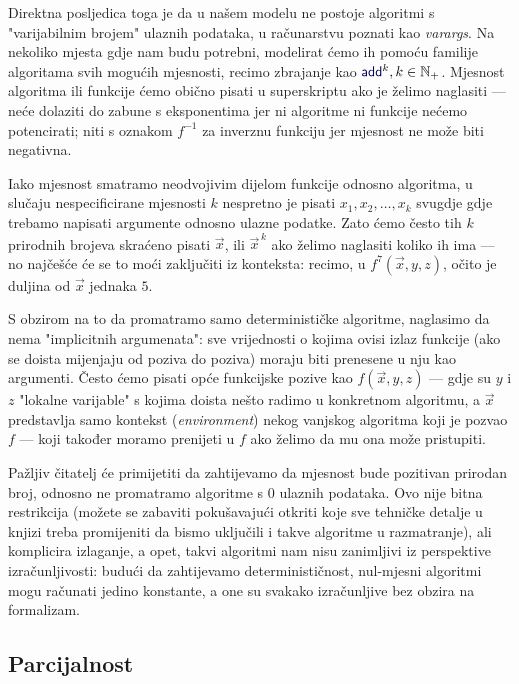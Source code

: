 Direktna posljedica toga je da u našem modelu ne postoje algoritmi s "varijabilnim brojem" ulaznih podataka, u računarstvu poznati kao \emph{varargs}. Na nekoliko mjesta gdje nam budu potrebni, modelirat ćemo ih pomoću familije algoritama svih mogućih mjesnosti, recimo zbrajanje kao $\f{add}^k,k\in\N_+$. Mjesnost algoritma ili funkcije ćemo obično pisati u superskriptu ako je želimo naglasiti --- neće dolaziti do zabune s eksponentima jer ni algoritme ni funkcije nećemo potencirati; niti s oznakom $f^{-1}$ za inverznu funkciju jer mjesnost ne može biti negativna.

Iako mjesnost smatramo neodvojivim dijelom funkcije odnosno algoritma, u slučaju nespecificirane mjesnosti $k$ nespretno je pisati $x_1,x_2,\dotsc,x_k$ svugdje gdje trebamo napisati argumente odnosno ulazne podatke. Zato ćemo često tih $k$ prirodnih brojeva skraćeno pisati $\vec x$, ili $\vec x^{\,k}$ ako želimo naglasiti koliko ih ima --- no najčešće će se to moći zaključiti iz konteksta: recimo, u $f^7(\vec x,y,z)$, očito je duljina od $\vec x$ jednaka $5$.

\begin{napomena}[{name=[svi argumenti moraju biti eksplicitno navedeni]}]\label{nap:blokovi}
S obzirom na to da promatramo samo determinističke algoritme, naglasimo da nema "implicitnih argumenata": sve vrijednosti o kojima ovisi izlaz funkcije (ako se doista mijenjaju od poziva do poziva) moraju biti prenesene u nju kao argumenti. Često ćemo pisati opće funkcijske pozive kao $f(\vec x,y,z)$ --- gdje su $y$ i $z$ "lokalne varijable" s kojima doista nešto radimo u konkretnom algoritmu, a $\vec x$ predstavlja samo kontekst (\emph{environment}) nekog vanjskog algoritma koji je pozvao $f$ --- koji također moramo prenijeti u $f$ ako želimo da mu ona može pristupiti.
\end{napomena}

Pažljiv čitatelj će primijetiti da zahtijevamo da mjesnost bude pozitivan prirodan broj, odnosno ne promatramo algoritme s $0$ ulaznih podataka. Ovo nije bitna restrikcija (možete se zabaviti pokušavajući otkriti koje sve tehničke detalje u knjizi treba promijeniti da bismo uključili i takve algoritme u razmatranje), ali komplicira izlaganje, a opet, takvi algoritmi nam nisu zanimljivi iz perspektive izračunljivosti: budući da zahtijevamo determinističnost, nul-mjesni algoritmi mogu računati jedino konstante, a one su svakako izračunljive bez obzira na formalizam.

\subsection{Parcijalnost}

